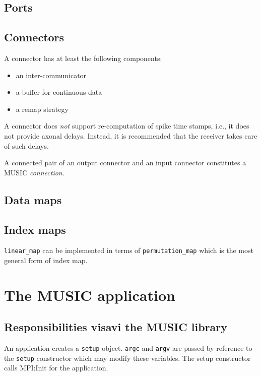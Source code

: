 \documentclass[a4paper]{report}
\begin{document}
\subsection{Ports}

\subsection{Connectors}

A connector has at least the following components:
\begin{itemize}
  \item an inter-communicator
  \item a buffer for continuous data
  \item a remap strategy
\end{itemize}

A connector does \emph{not} support re-computation of spike time
stamps, i.e., it does not provide axonal delays.  Instead, it is
recommended that the receiver takes care of such delays.

A connected pair of an output connector and an input connector
constitutes a MUSIC \emph{connection}.

\subsection{Data maps}

\subsection{Index maps}

\verb|linear_map| can be implemented in terms of
\verb|permutation_map| which is the most general form of index map.

\section{The MUSIC application}

\subsection{Responsibilities visavi the MUSIC library}
\label{sec:responsibilities}

An application creates a \verb|setup| object.  \verb|argc| and
\verb|argv| are passed by reference to the \verb|setup| constructor
which may modify these variables.  The setup constructor calls
MPI:Init for the application.
\end{document}
